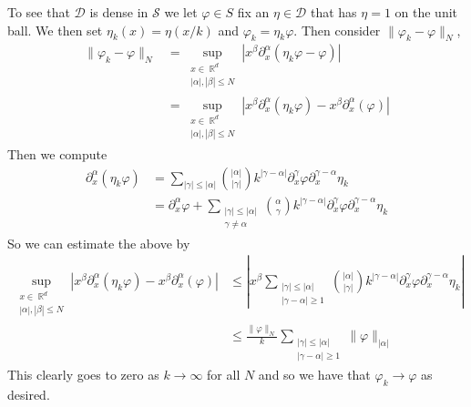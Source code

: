 \documentclass{article}
\DeclareMathOperator{\R}{\mathbb{R}}
\newcommand{\norm}[1]{\|#1\|}
\begin{document}
To see that $\mathcal{D}$ is dense in $\mathcal{S}$ we let $\varphi
\in S$ fix an $\eta \in \mathcal{D}$ that has $\eta = 1$ on the unit
ball. We then set $\eta_k(x) = \eta(x/k)$ and $\varphi_k =
\eta_k\varphi$. Then consider $\norm{\varphi_k - \varphi}_N$,
\begin{align*}
  \norm{\varphi_k - \varphi}_N &= \sup_{\substack{x\in \R^d \\
      |\alpha|,|\beta| \leq N}}
  |x^\beta\partial_x^\alpha(\eta_k\varphi - \varphi)| \\
  &= \sup_{\substack{x\in \R^d \\
      |\alpha|,|\beta| \leq N}}
  |x^\beta\partial_x^\alpha(\eta_k\varphi) -
  x^\beta\partial_x^\alpha(\varphi)|
\end{align*}
Then we compute
\begin{align*}
  \partial_x^\alpha(\eta_k\varphi) &= \sum_{|\gamma| \leq |\alpha|}
  \binom{|\alpha|}{|\gamma|}k^{|\gamma - \alpha|}\partial_x^\gamma
  \varphi\partial_x^{\gamma - \alpha}\eta_k \\
  &= \partial_x^\alpha\varphi +\sum_{\substack{|\gamma| \leq |\alpha|
      \\ \gamma \neq \alpha}} \binom{\alpha}{\gamma}k^{|\gamma -
    \alpha|}\partial_x^\gamma \varphi\partial_x^{\gamma -
    \alpha}\eta_k
\end{align*}
So we can estimate the above by
\begin{align*}
  \sup_{\substack{x\in \R^d \\
      |\alpha|,|\beta| \leq N}}
  |x^\beta\partial_x^\alpha(\eta_k\varphi) -
  x^\beta\partial_x^\alpha(\varphi)| &\leq \left|
    x^{\beta}\sum_{\substack{|\gamma| \leq |\alpha| \\ |\gamma -
        \alpha| \geq 1}} \binom{|\alpha|}{|\gamma|}k^{|\gamma -
      \alpha|}\partial_x^\gamma \varphi\partial_x^{\gamma -
      \alpha}\eta_k\right| \\
  &\leq \frac{\norm{\varphi}_N}{k} \sum_{\substack{|\gamma| \leq
      |\alpha| \\ |\gamma - \alpha| \geq 1}} \norm{\varphi}_{|\alpha|}
\end{align*}
This clearly goes to zero as $k \to \infty$ for all $N$ and so we have
that $\varphi_k \to \varphi$ as desired.
\end{document}
